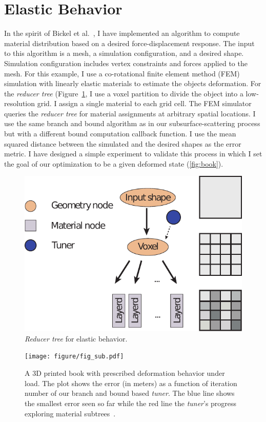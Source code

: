 \section{Elastic Behavior}
In the spirit of Bickel et al.~,
I have implemented an algorithm to compute material distribution based on a desired force-displacement response.
The input to this algorithm is a mesh, a simulation configuration, and a desired shape.
Simulation configuration includes vertex constraints and forces applied to the mesh.
For this example, I use a co-rotational finite element method (FEM) simulation
with linearly elastic materials to estimate the objects deformation.
For the \emph{reducer tree} (Figure~\ref{fig:treeDeform},
I use a voxel partition to divide the object into a low-resolution grid.
I assign a single material to each grid cell.
The FEM simulator queries the \emph{reducer tree} for material assignments at arbitrary spatial locations.
I use the same branch and bound algorithm as in our subsurface-scattering process
but with a different bound computation callback function.
I use the mean squared distance between the simulated and the desired shapes as the error metric.
I have designed a simple experiment to validate this process
in which I set the goal of our optimization to be a given deformed state (\autoref{fig:book}).
\begin{figure}[h]
\centering
\includegraphics[scale=0.7]{figure/treeDeform.pdf}
\caption {\emph{Reducer tree} for elastic behavior.
}
\label{fig:treeDeform}
\end{figure}

\begin{figure}[h]
\centering
\texttt{[image: figure/fig\_sub.pdf]}
\caption {A 3D printed book with prescribed deformation behavior under load.
The plot shows the error (in meters) as a function of iteration number of our branch and bound based \emph{tuner}.
The blue line shows the smallest error seen so far while the red line the \emph{tuner}'s progress exploring material subtrees~\protect\cite{Bickel:2009}.}
\label{fig:book}
\end{figure}

